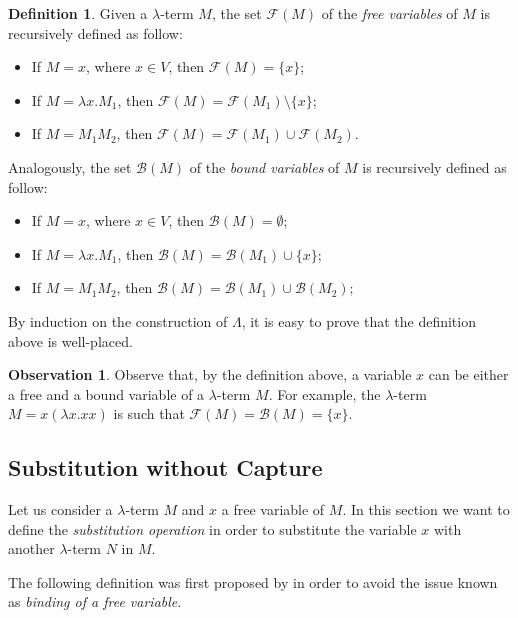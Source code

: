 \documentclass[a4paper,11pt]{article}
\theoremstyle{definition}
\newtheorem{defn}{Definition}
\newtheorem{oss}{Observation}
\newcommand{\FF}{\mathcal{F}}
\newcommand{\BB}{\mathcal{B}}
\begin{document}
\begin{defn}
  Given a $\lambda$-term $M$, the set $\FF(M)$ of the \textit{free variables}
  of $M$ is recursively defined as follow:
  \begin{itemize}
    \item If $M=x$, where $x\in V$, then $\FF(M)=\{x\}$;
    \item If $M=\lambda x.M_1$, then $\FF(M)=\FF(M_1)\setminus\{x\}$;
    \item If $M=M_1M_2$, then $\FF(M)=\FF(M_1)\cup\FF(M_2)$.
  \end{itemize}
  Analogously, the set $\BB(M)$ of the \textit{bound variables} of $M$
  is recursively defined as follow:
  \begin{itemize}
    \item If $M=x$, where $x\in V$, then $\BB(M)=\emptyset$;
    \item If $M=\lambda x.M_1$, then $\BB(M) = \BB(M_1)\cup \{x\}$;
    \item If $M=M_1M_2$, then $\BB(M)=\BB(M_1)\cup\BB(M_2)$;
  \end{itemize}
\end{defn}
By induction on the construction of $\Lambda$, it is easy to prove that
the definition above is well-placed.

\begin{oss}
  Observe that, by the definition above, a variable $x$ can be either a free and 
  a bound variable of a $\lambda$-term $M$. For example, the 
  $\lambda$-term $M=x(\lambda x.xx)$ is such that $\FF(M) = \BB(M) = \{x\}$.
\end{oss}

\subsection{Substitution without Capture}
Let us consider a $\lambda$-term $M$ and $x$ a free variable of $M$. In this
section we want to define the \textit{substitution operation} in order to
substitute the variable $x$ with another $\lambda$-term $N$ in $M$.

The following definition was first proposed by \cite{Curry} in order to avoid the
issue known as \textit{binding of a free variable}.
\end{document}
